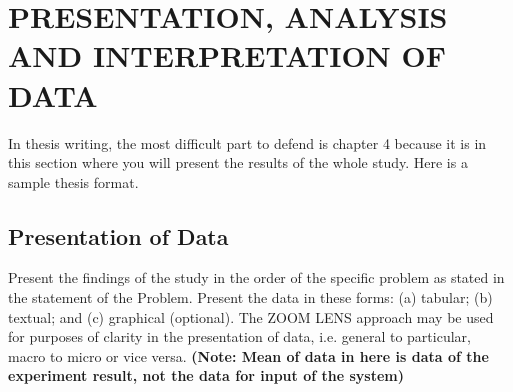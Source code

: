 \chapter{PRESENTATION, ANALYSIS AND INTERPRETATION OF DATA}
In thesis writing, the most difficult part to defend is chapter 4 because it is in this section where you will present the results of the whole study. Here is a sample thesis format.

\section{Presentation of Data}
Present the findings of the study in the order of the specific problem as stated in the statement of the Problem. Present the data in these forms: (a) tabular; (b) textual; and (c) graphical (optional). The ZOOM LENS approach may be used for purposes of clarity in the presentation of data, i.e. general to particular, macro to micro or vice versa. \textbf{(Note: Mean of data in here is data of the experiment result, not the data for input of the system)}
